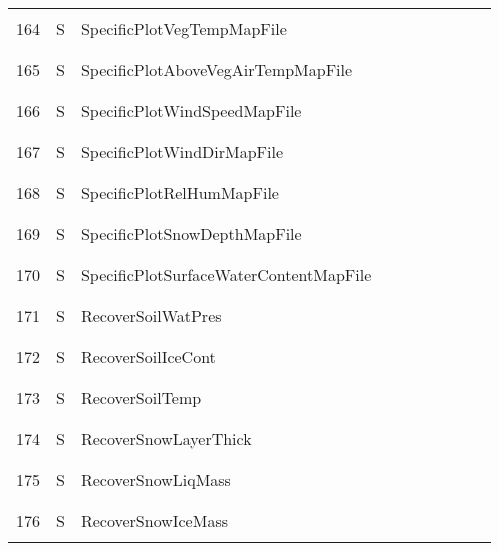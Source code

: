\begin{longtable}{|c|c|l|c|c|c|c|p{}|c|p{}|}
&&&&&&&&&\\
164 & S & SpecificPlotVegTempMapFile & & & & & & & \\
&&&&&&&&&\\\hline%
&&&&&&&&&\\
165 & S & SpecificPlotAboveVegAirTempMapFile & & & & & & & \\
&&&&&&&&&\\\hline%
&&&&&&&&&\\
166 & S & SpecificPlotWindSpeedMapFile & & & & & & & \\
&&&&&&&&&\\\hline%
&&&&&&&&&\\
167 & S & SpecificPlotWindDirMapFile & & & & & & & \\
&&&&&&&&&\\\hline%
&&&&&&&&&\\
168 & S & SpecificPlotRelHumMapFile & & & & & & & \\
&&&&&&&&&\\\hline%
&&&&&&&&&\\
169 & S & SpecificPlotSnowDepthMapFile & & & & & & & \\
&&&&&&&&&\\\hline%
&&&&&&&&&\\
170 & S & SpecificPlotSurfaceWaterContentMapFile & & & & & & & \\
&&&&&&&&&\\\hline%
&&&&&&&&&\\
171 & S & RecoverSoilWatPres & & & & & & & \\
&&&&&&&&&\\\hline%
&&&&&&&&&\\
172 & S & RecoverSoilIceCont & & & & & & & \\
&&&&&&&&&\\\hline%
&&&&&&&&&\\
173 & S & RecoverSoilTemp & & & & & & & \\
&&&&&&&&&\\\hline%
&&&&&&&&&\\
174 & S & RecoverSnowLayerThick & & & & & & & \\
&&&&&&&&&\\\hline%
&&&&&&&&&\\
175 & S & RecoverSnowLiqMass & & & & & & & \\
&&&&&&&&&\\\hline%
&&&&&&&&&\\
176 & S & RecoverSnowIceMass & & & & & & & \\
&&&&&&&&&\\\hline%

\end{longtable}
